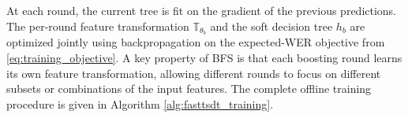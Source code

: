 \documentclass[journal]{IEEEtran}
\begin{document}
    At each round, the current tree is fit on the gradient of the previous predictions. The per-round feature transformation $\mathbb{T}_{\theta_b}$ and the soft decision tree $h_{b}$ are optimized jointly using backpropagation on the expected-WER objective from \eqref{eq:training_objective}. 
    A key property of BFS is that each boosting round learns its
    own feature transformation, allowing different rounds to focus
    on different subsets or combinations of the input features.
    The complete offline training procedure is given in Algorithm \ref{alg:fasttsdt_training}.
\end{document}
